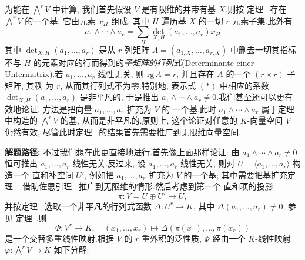 为能在 $\bigwedge^r V$ 中计算, 我们首先假设 $V$ 是有限维的并带有基 $X$.则按
定理~ 存在 $\bigwedge^r V$ 的一个基, 它由元素 $x_H$ 组成, 其中 $H$
遍历基 $X$ 的一切 $r$ 元素子集.此外有
\begin{equation}
a_1 \wedge \cdots \wedge a_r = \sum_H \det_{X, H}(a_1, \ldots, a_r) x_H \tag{$*$}
\end{equation}
其中 $\det_{X, H}(a_1, \ldots, a_r)$ 是从 $r$ 列矩阵 $A = (a_{1, X}, \ldots, a_{r, X})$
中删去一切其指标不与 $H$ 的元素对应的行而得到的\emph{子矩阵的行列式}(\textup{Determinante einer Untermatrix}).若 $a_1, \ldots, a_r$
线性无关, 则 $\mathrm{rg}\, A = r$, 并且存在 $A$ 的一个 $(r \times r)$ 子矩阵, 其秩
为 $r$, 从而其行列式不为零.特别地, 表示式 $(*)$ 中相应的系数
$\det_{X, H}(a_1, \ldots, a_r)$ 是非平凡的, 于是推出 $a_1 \wedge \cdots \wedge a_r
\neq 0$.我们甚至还可以更有效地论证, 方法是把向量 $a_1, \ldots, a_r$ 扩充为 $V$ 的
一个基.此时 $a_1 \wedge \cdots \wedge a_r$ 属于定理~ 中构造的
$\bigwedge^r V$ 的基, 从而是非平凡的.原则上, 这个论证对任意的 $K$-向量空间 $V$
仍然有效, 尽管此时定理~ 的结果首先需要推广到无限维向量空间.

\noindent\textbf{解题路径:} 不过我们想在此更直接地进行.首先像上面那样论证: 由
$a_1 \wedge \cdots \wedge a_r \neq 0$ 恒可推出 $a_1, \ldots, a_r$ 线性无关.反过来,
设 $a_1, \ldots, a_r$ 线性无关, 则对 $U = \langle a_1, \ldots, a_r \rangle$ 构造一个
直和补空间 $U'$, 例如把 $a_1, \ldots, a_r$ 扩充为 $V$ 的一个基; 其中需要把基扩充定理
~ 借助佐恩引理~ 推广到无限维的情形.然后考虑到第一个
直和项的投影
\[
\pi \colon V = U \oplus U' \longrightarrow U,
\]
并按定理~ 选取一个非平凡的行列式函数 $\varDelta \colon U^r
\longrightarrow K$, 其中 $\varDelta(a_1, \ldots, a_r) \neq 0$; 参见
定理~.则
\[
\Phi \colon V^r \longrightarrow K, \quad (x_1, \ldots, x_r) \longmapsto \varDelta(\pi(x_1), \ldots, \pi(x_r))
\]
是一个交替多重线性映射.根据 $V$ 的 $r$ 重外积的泛性质, $\Phi$ 经由一个 $K$-线性映射
$\varphi \colon \bigwedge^r V \longrightarrow K$ 如下分解:

\begin{center}
\end{center}


